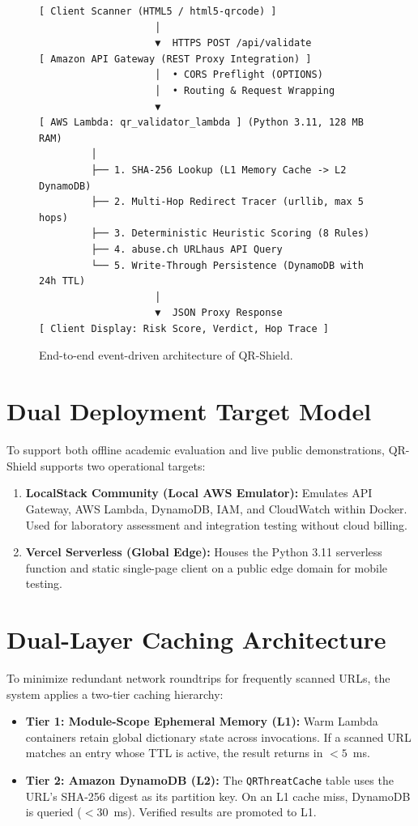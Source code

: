 \documentclass[12pt,a4paper]{report}
\begin{document}
\begin{figure}[htbp]
\centering
\begin{verbatim}
[ Client Scanner (HTML5 / html5-qrcode) ]
                    │
                    ▼  HTTPS POST /api/validate
[ Amazon API Gateway (REST Proxy Integration) ]
                    │  • CORS Preflight (OPTIONS)
                    │  • Routing & Request Wrapping
                    ▼
[ AWS Lambda: qr_validator_lambda ] (Python 3.11, 128 MB RAM)
         │
         ├── 1. SHA-256 Lookup (L1 Memory Cache -> L2 DynamoDB)
         ├── 2. Multi-Hop Redirect Tracer (urllib, max 5 hops)
         ├── 3. Deterministic Heuristic Scoring (8 Rules)
         ├── 4. abuse.ch URLhaus API Query
         └── 5. Write-Through Persistence (DynamoDB with 24h TTL)
                    │
                    ▼  JSON Proxy Response
[ Client Display: Risk Score, Verdict, Hop Trace ]
\end{verbatim}
\caption{End-to-end event-driven architecture of QR-Shield.}
\label{fig:architecture}
\end{figure}

\section{Dual Deployment Target Model}
To support both offline academic evaluation and live public demonstrations, QR-Shield supports two operational targets:
\begin{enumerate}
    \item \textbf{LocalStack Community (Local AWS Emulator):} Emulates API Gateway, AWS Lambda, DynamoDB, IAM, and CloudWatch within Docker. Used for laboratory assessment and integration testing without cloud billing.
    \item \textbf{Vercel Serverless (Global Edge):} Houses the Python 3.11 serverless function and static single-page client on a public edge domain for mobile testing.
\end{enumerate}

\section{Dual-Layer Caching Architecture}
To minimize redundant network roundtrips for frequently scanned URLs, the system applies a two-tier caching hierarchy:
\begin{itemize}
    \item \textbf{Tier 1: Module-Scope Ephemeral Memory (L1):} Warm Lambda containers retain global dictionary state across invocations. If a scanned URL matches an entry whose TTL is active, the result returns in $< 5$~ms.
    \item \textbf{Tier 2: Amazon DynamoDB (L2):} The \texttt{QRThreatCache} table uses the URL's SHA-256 digest as its partition key. On an L1 cache miss, DynamoDB is queried ($< 30$~ms). Verified results are promoted to L1.
\end{itemize}
\end{document}
